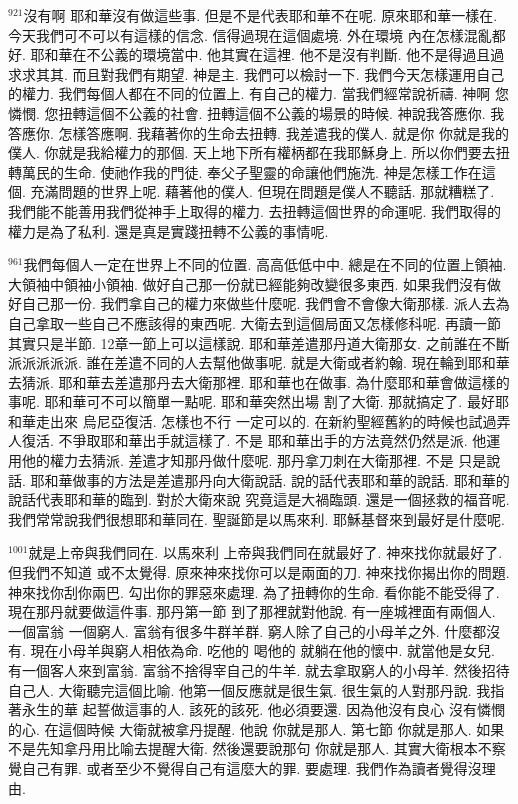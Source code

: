 \documentclass{book}
\begin{document}
$^{921}$沒有啊 耶和華沒有做這些事.
但是不是代表耶和華不在呢.
原來耶和華一樣在.
今天我們可不可以有這樣的信念.
信得過現在這個處境.
外在環境 內在怎樣混亂都好.
耶和華在不公義的環境當中.
他其實在這裡.
他不是沒有判斷.
他不是得過且過 求求其其.
而且對我們有期望.
神是主.
我們可以檢討一下.
我們今天怎樣運用自己的權力.
我們每個人都在不同的位置上.
有自己的權力.
當我們經常說祈禱.
神啊 您憐憫.
您扭轉這個不公義的社會.
扭轉這個不公義的場景的時候.
神說我答應你.
我答應你.
怎樣答應啊.
我藉著你的生命去扭轉.
我差遣我的僕人.
就是你 你就是我的僕人.
你就是我給權力的那個.
天上地下所有權柄都在我耶穌身上.
所以你們要去扭轉萬民的生命.
使祂作我的門徒.
奉父子聖靈的命讓他們施洗.
神是怎樣工作在這個.
充滿問題的世界上呢.
藉著他的僕人.
但現在問題是僕人不聽話.
那就糟糕了.
我們能不能善用我們從神手上取得的權力.
去扭轉這個世界的命運呢.
我們取得的權力是為了私利.
還是真是實踐扭轉不公義的事情呢.

$^{961}$我們每個人一定在世界上不同的位置.
高高低低中中.
總是在不同的位置上領袖.
大領袖中領袖小領袖.
做好自己那一份就已經能夠改變很多東西.
如果我們沒有做好自己那一份.
我們拿自己的權力來做些什麼呢.
我們會不會像大衛那樣.
派人去為自己拿取一些自己不應該得的東西呢.
大衛去到這個局面又怎樣修科呢.
再讀一節 其實只是半節.
12章一節上可以這樣說.
耶和華差遣那丹道大衛那女.
之前誰在不斷派派派派派.
誰在差遣不同的人去幫他做事呢.
就是大衛或者約翰.
現在輪到耶和華去猜派.
耶和華去差遣那丹去大衛那裡.
耶和華也在做事.
為什麼耶和華會做這樣的事呢.
耶和華可不可以簡單一點呢.
耶和華突然出場 割了大衛.
那就搞定了.
最好耶和華走出來 烏尼亞復活.
怎樣也不行 一定可以的.
在新約聖經舊約的時候也試過弄人復活.
不爭取耶和華出手就這樣了.
不是 耶和華出手的方法竟然仍然是派.
他運用他的權力去猜派.
差遣才知那丹做什麼呢.
那丹拿刀刺在大衛那裡.
不是 只是說話.
耶和華做事的方法是差遣那丹向大衛說話.
說的話代表耶和華的說話.
耶和華的說話代表耶和華的臨到.
對於大衛來說 究竟這是大禍臨頭.
還是一個拯救的福音呢.
我們常常說我們很想耶和華同在.
聖誕節是以馬來利.
耶穌基督來到最好是什麼呢.

$^{1001}$就是上帝與我們同在.
以馬來利 上帝與我們同在就最好了.
神來找你就最好了.
但我們不知道 或不太覺得.
原來神來找你可以是兩面的刀.
神來找你揭出你的問題.
神來找你刮你兩巴.
勾出你的罪惡來處理.
為了扭轉你的生命.
看你能不能受得了.
現在那丹就要做這件事.
那丹第一節 到了那裡就對他說.
有一座城裡面有兩個人.
一個富翁 一個窮人.
富翁有很多牛群羊群.
窮人除了自己的小母羊之外.
什麼都沒有.
現在小母羊與窮人相依為命.
吃他的 喝他的 就躺在他的懷中.
就當他是女兒.
有一個客人來到富翁.
富翁不捨得宰自己的牛羊.
就去拿取窮人的小母羊.
然後招待自己人.
大衛聽完這個比喻.
他第一個反應就是很生氣.
很生氣的人對那丹說.
我指著永生的華 起誓做這事的人.
該死的該死.
他必須要還.
因為他沒有良心 沒有憐憫的心.
在這個時候 大衛就被拿丹提醒.
他說 你就是那人.
第七節 你就是那人.
如果不是先知拿丹用比喻去提醒大衛.
然後還要說那句 你就是那人.
其實大衛根本不察覺自己有罪.
或者至少不覺得自己有這麼大的罪.
要處理.
我們作為讀者覺得沒理由.
\end{document}
